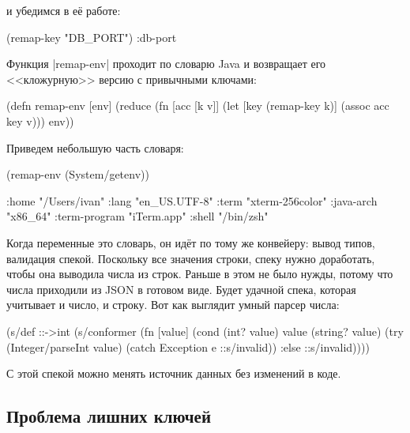 \noindent
и убедимся в е\"{е} работе:

\begin{english}
  \begin{clojure}
(remap-key "DB_PORT")
:db-port
  \end{clojure}
\end{english}


Функция \spverb|remap-env| проходит по словарю Java и возвращает его
<<кложурную>> версию с привычными ключами:

\begin{english}
  \begin{clojure}
(defn remap-env [env]
  (reduce
   (fn [acc [k v]]
     (let [key (remap-key k)]
       (assoc acc key v)))
   {}
   env))
  \end{clojure}
\end{english}

\noindent
Приведем небольшую часть словаря:

\begin{english}
  \begin{clojure}
(remap-env (System/getenv))

{:home "/Users/ivan"
 :lang "en_US.UTF-8"
 :term "xterm-256color"
 :java-arch "x86_64"
 :term-program "iTerm.app"
 :shell "/bin/zsh"}
  \end{clojure}
\end{english}

Когда переменные это словарь, он ид\"{е}т по тому же конвейеру: вывод типов,
валидация спекой. Поскольку все значения строки, спеку нужно доработать, чтобы
она выводила числа из строк. Раньше в этом не было нужды, потому что числа
приходили из JSON в готовом виде. Будет удачной спека, которая учитывает и
число, и строку. Вот как выглядит умный парсер числа:

\begin{english}
  \begin{clojure}
(s/def ::->int
  (s/conformer
   (fn [value]
     (cond
       (int? value) value
       (string? value)
       (try (Integer/parseInt value)
            (catch Exception e
              ::s/invalid))
       :else ::s/invalid))))
  \end{clojure}
\end{english}

\noindent
С этой спекой можно менять источник данных без изменений в коде.

\subsection{Проблема лишних ключей}

